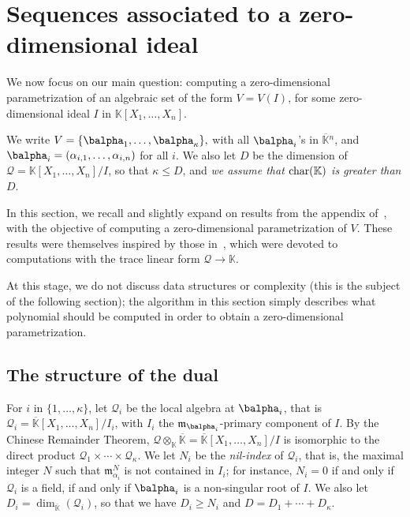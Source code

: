 \documentclass[12pt]{article}
\newcommand{\residueI}{\mathscr{Q}}
\def\dg{\kappa}
\def\K{\mathbb{K}}
\def\K {\ensuremath{\mathbb{K}}}
\def\Kbar {{\ensuremath{\overline{\mathbb{K}}}}}
\def\D {\ensuremath{D}}
\def\m {\ensuremath{\mathfrak{m}}}
\begin{document}

\section{Sequences associated to a zero-dimensional ideal}\label{sec:seq0}

We now focus on our main question: computing a zero-dimensional
parametrization of an algebraic set of the form $V=V(I)$, for some
zero-dimensional ideal $I$ in $\K[X_1,\dots,X_n]$. 

We write $V=\{\balpha_1,\dots,\balpha_\dg\},$ with all $\balpha_i$'s
in $\Kbar{}^n$, and $\balpha_i=(\alpha_{i,1},\dots,\alpha_{i,n})$ for
all $i$.  We also let $\D$ be the dimension of
$\residueI=\K[X_1,\dots,X_n]/I$, so that $\dg \le \D$, and {\em we
  assume that ${\rm char}(\K)$ is greater than $D$}.

In this section, we recall and slightly expand on results from the appendix
of~\cite{BoSaSc03}, with the objective of computing a zero-dimensional
parametrization of $V$. These results were themselves inspired by 
those in~\cite{Rouillier99}, which were devoted to computations
with the trace linear form $\residueI\to\K$.

At this stage, we do not discuss data structures or complexity (this
is the subject of the following section); the algorithm in this
section simply describes what polynomial should be computed in order
to obtain a zero-dimensional parametrization.


\subsection{The structure of the dual}\label{ssec:dual}

For $i$ in $\{1,\dots,\dg\}$, let $\residueI_i$ be the local algebra at
$\balpha_i$, that is $\residueI_i=\Kbar[X_1,\dots,X_n]/I_i$, with $I_i$ the
$\m_{\balpha_i}$-primary component of $I$. By the Chinese Remainder
Theorem, $\residueI\otimes_\K \Kbar=\Kbar[X_1,\dots,X_n]/I$ is isomorphic to
the direct product $\residueI_1\times \cdots \times \residueI_\dg$.  We let $N_i$ be the
{\em nil-index} of $\residueI_i$, that is, the maximal integer $N$ such that
$\m_{\alpha_i}^N$ is not contained in $I_i$; for instance, $N_i=0$ if
and only if $\residueI_i$ is a field, if and only if $\balpha_i$ is a
non-singular root of $I$. We also let $\D_i=\dim_\Kbar(\residueI_i)$, so that
we have $D_i \ge N_i$ and $\D=\D_1 + \cdots + \D_\dg$.
\end{document}
